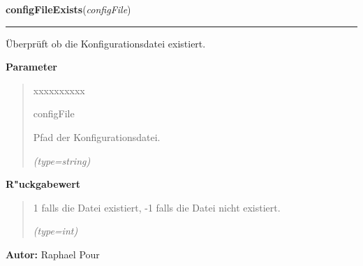 \hspace{.8\funcindent}\begin{boxedminipage}{\funcwidth}

    \raggedright \textbf{configFileExists}(\textit{configFile})

    \vspace{-1.5ex}

    \rule{\textwidth}{0.5\fboxrule}
\setlength{\parskip}{2ex}
    Überprüft ob die Konfigurationsdatei existiert.

\setlength{\parskip}{1ex}
      \textbf{Parameter}
      \vspace{-1ex}

      \begin{quote}
        \begin{Ventry}{xxxxxxxxxx}

          \item[configFile]

          Pfad der Konfigurationsdatei.

            {\it (type=string)}

        \end{Ventry}

      \end{quote}

      \textbf{R"uckgabewert}
    \vspace{-1ex}

      \begin{quote}
      1 falls die Datei existiert, -1 falls die Datei nicht existiert.

      {\it (type=int)}

      \end{quote}

\textbf{Autor:} Raphael Pour



    \end{boxedminipage}

    \label{ledleuchtturm:fileFunc:configFileValidJsonFile}

    \vspace{0.5ex}

